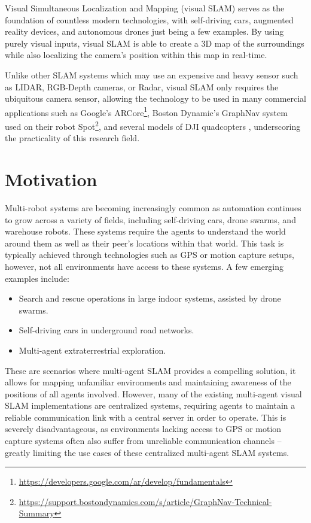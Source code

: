 
\label{sec:1}
Visual Simultaneous Localization and Mapping (visual SLAM) serves as the foundation of countless modern technologies, with self-driving cars, augmented reality devices, and autonomous drones just being a few examples. By using purely visual inputs, visual SLAM is able to create a 3D map of the surroundings while also localizing the camera's position within this map in real-time.

Unlike other SLAM systems which may use an expensive and heavy sensor such as LIDAR, RGB-Depth cameras, or Radar, visual SLAM only requires the ubiquitous camera sensor, allowing the technology to be used in many commercial applications such as Google's ARCore\footnote[1]{\url{https://developers.google.com/ar/develop/fundamentals}}, Boston Dynamic's GraphNav system used on their robot Spot\footnote[2]{\url{https://support.bostondynamics.com/s/article/GraphNav-Technical-Summary}}, and several models of DJI quadcopters \autocite{zou2019collaborative}, underscoring the practicality of this research field.

\section{Motivation}
\label{sec:motivation}
Multi-robot systems are becoming increasingly common as automation continues to grow across a variety of fields, including self-driving cars, drone swarms, and warehouse robots. These systems require the agents to understand the world around them as well as their peer's locations within that world. This task is typically achieved through technologies such as GPS or motion capture setups, however, not all environments have access to these systems. A few emerging examples include: \noparskip
\smallbreak
{
    \begin{itemize}[nosep]
        \item Search and rescue operations in large indoor systems, assisted by drone swarms.
        \item Self-driving cars in underground road networks.
        \item Multi-agent extraterrestrial exploration.
    \end{itemize}
}

These are scenarios where multi-agent SLAM provides a compelling solution, it allows for mapping unfamiliar environments and maintaining awareness of the positions of all agents involved. However, many of the existing multi-agent visual SLAM implementations are centralized systems, requiring agents to maintain a reliable communication link with a central server in order to operate. This is severely disadvantageous, as environments lacking access to GPS or motion capture systems often also suffer from unreliable communication channels – greatly limiting the use cases of these centralized multi-agent SLAM systems.

